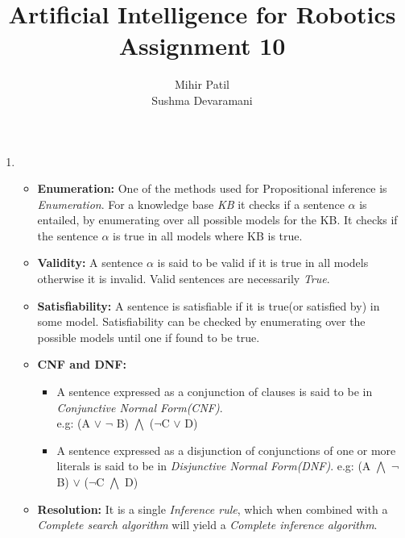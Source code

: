 \documentclass[11pt, a4paper]{report}
\title{Artificial Intelligence for Robotics \\Assignment 10}
\author{Mihir Patil\\Sushma Devaramani}
\begin{document}
\begin{titlepage}
\maketitle
\end{titlepage}

\begin{enumerate}

\item\begin{itemize}
Describe the following concepts in the context of logical reasoning as precisely and compact as possible.
\item \textbf{Enumeration:} One of the methods used for Propositional inference is \textit{Enumeration}. For a knowledge base \textit{KB} it checks if a sentence \textit{$\alpha$} is entailed, by enumerating over all possible models for the KB. It checks if the sentence $\alpha$ is true in all models where KB is true.

\item \textbf{Validity:} A sentence \textit{$\alpha$} is said to be valid if it is true in all models otherwise it is invalid. Valid sentences are necessarily \textit{True}.

\item \textbf{Satisfiability:} A sentence is satisfiable if it is true(or satisfied by) in some model. Satisfiability can be checked by enumerating over the possible models until one if found to be true.

\item \textbf{CNF and DNF:} \begin{itemize}
\item A sentence expressed as a conjunction of clauses is said to be in \textit{Conjunctive Normal Form(CNF)}.\\ e.g: (A $\vee$ $\neg$ B) $\bigwedge$ ($\neg$C $\vee$ D)

\item A sentence expressed as a disjunction of conjunctions of one or more literals is said to be in \textit{Disjunctive Normal Form(DNF)}. e.g: (A $\bigwedge$ $\neg$ B) $\vee$ ($\neg$C $\bigwedge$ D)

\end{itemize} 

\item \textbf{Resolution:} It is a single \textit{Inference rule}, which when combined with a \textit{Complete search algorithm } will yield a \textit{Complete inference algorithm}.


\end{itemize}
\end{enumerate}
\end{document}
